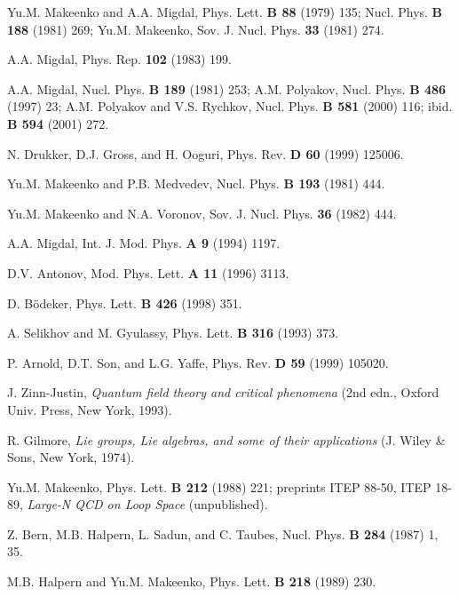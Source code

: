 \documentclass[a4paper,12pt]{article}
\begin{document}

\begin{thebibliography}{99}
Yu.M. Makeenko and A.A. Migdal, Phys. Lett. {\bf B 88} (1979) 135;
Nucl. Phys. {\bf B 188} (1981) 269;
Yu.M. Makeenko, Sov. J. Nucl. Phys. {\bf 33} (1981) 274.

A.A. Migdal, Phys. Rep. {\bf 102} (1983) 199.

A.A. Migdal, Nucl. Phys. {\bf B 189} (1981) 253;
A.M. Polyakov, Nucl. Phys. {\bf B 486} (1997) 23;
A.M. Polyakov and V.S. Rychkov, Nucl. Phys. {\bf B 581} (2000) 116; ibid. {\bf B 594} (2001) 272.


N. Drukker, D.J. Gross, and H. Ooguri, Phys. Rev. {\bf D 60} (1999) 125006.

Yu.M. Makeenko and P.B. Medvedev, Nucl. Phys. {\bf B 193} (1981) 444.

Yu.M. Makeenko and N.A. Voronov, Sov. J. Nucl. Phys. {\bf 36} (1982) 444.

A.A. Migdal, Int. J. Mod. Phys. {\bf A 9} (1994) 1197.

D.V. Antonov, Mod. Phys. Lett. {\bf A 11} (1996) 3113.

D. B\"odeker, Phys. Lett. {\bf B 426} (1998) 351.

A. Selikhov and M. Gyulassy, Phys. Lett. {\bf B 316} (1993) 373.

P. Arnold, D.T. Son, and L.G. Yaffe, Phys. Rev. {\bf D 59} (1999) 105020.

J. Zinn-Justin,
{\it Quantum field theory and critical phenomena} (2nd edn., Oxford Univ. Press,
New York, 1993).

R. Gilmore, {\it Lie groups, Lie algebras, and some of their applications}
(J. Wiley \& Sons, New York, 1974).

Yu.M. Makeenko, Phys. Lett. {\bf B 212} (1988) 221; preprints ITEP 88-50, ITEP 18-89,
{\it Large-N QCD on Loop Space} (unpublished).

Z. Bern, M.B. Halpern, L. Sadun, and C. Taubes, Nucl. Phys. {\bf B 284} (1987) 1, 35.

M.B. Halpern and Yu.M. Makeenko, Phys. Lett. {\bf B 218} (1989) 230.

\end{thebibliography}
\end{document}
